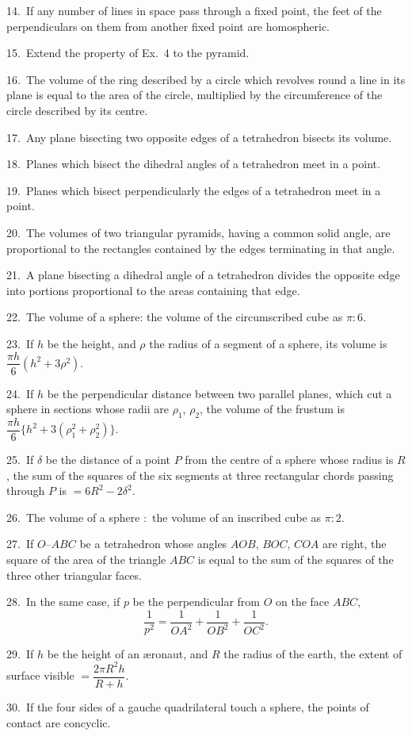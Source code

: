 \documentclass[oneside]{book}
\begin{document}
\begin{footnotesize}
14.~If any number of lines in space pass through a fixed point,
the feet of the perpendiculars on them from another fixed point
are homospheric.

15.~Extend the property of Ex.~4 to the pyramid.

16.~The volume of the ring described by a circle which revolves
round a line in its plane is equal to the area of the circle, multiplied
by the circumference of the circle described by its centre.

17.~Any plane bisecting two opposite edges of a tetrahedron
bisects its volume.

18.~Planes which bisect the dihedral angles of a tetrahedron
meet in a point.

19.~Planes which bisect perpendicularly the edges of a
tetrahedron meet in a point.

20.~The volumes of two triangular pyramids, having a common
solid angle, are proportional to the rectangles contained by the
edges terminating in that angle.

21.~A plane bisecting a dihedral angle of a tetrahedron divides
the opposite edge into portions proportional to the areas containing
that edge.


22.~The volume of a sphere: the volume of the circumscribed
cube as $\pi : 6$.

23.~If $h$ be the height, and $\rho$ the radius of a segment of a
sphere, its volume is $\dfrac{\pi h}{6} (h^2 + 3 \rho^2)$.

24.~If $h$ be the perpendicular distance between two parallel
planes, which cut a sphere in sections whose radii are $\rho_1$, $\rho_2$, the
volume of the frustum is $\dfrac{\pi h}{6} \{h^2 + 3(\rho_1^2 + \rho_2^2)\}$.

25.~If $\delta$ be the distance of a point $P$ from the centre of a sphere
whose radius is $R$, the sum of the squares of the six segments at
three rectangular chords passing through $P$ is $= 6R^2 - 2\delta^2$.

26.~The volume of a sphere $:$ the volume of an inscribed cube
as $\pi : 2$.

27.~If $O$--$ABC$ be a tetrahedron whose angles $AOB$, $BOC$,
$COA$ are right, the square of the area of the triangle $ABC$ is equal
to the sum of the squares of the three other triangular faces.

28.~In the same case, if $p$ be the perpendicular from $O$ on the
face $ABC$,
\begin{equation*}
\frac{1} {p^2} = \frac{1} {OA^2} + \frac{1} {OB^2} + \frac{1} {OC^2}.
\end{equation*}

29.~If $h$ be the height of an {\ae}ronaut, and $R$ the radius of the
earth, the extent of surface visible $= \dfrac{2\pi R^2 h} {R + h}$.

30.~If the four sides of a gauche quadrilateral touch a sphere,
the points of contact are concyclic.
\par\end{footnotesize}
\end{document}
